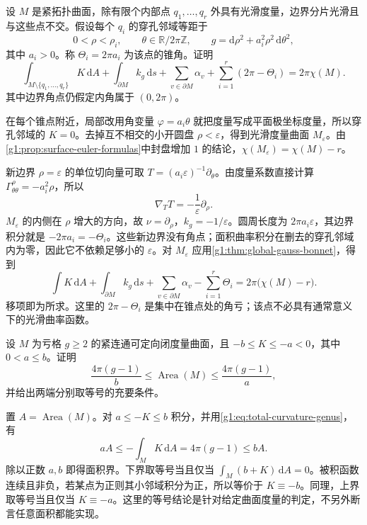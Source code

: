 \begin{exercise}\label{g1:ex:gb-cone-points}
	设 \(M\) 是紧拓扑曲面，除有限个内部点 \(q_1,\ldots,q_r\) 外具有光滑度量，边界分片光滑且与这些点不交。假设每个 \(q_i\) 的穿孔邻域等距于
	\[
		0<\rho<\rho_i,\qquad \theta\in\mathbb R/2\pi\mathbb Z,
		\qquad g=\mathrm{d}\rho^2+a_i^2\rho^2\,\mathrm{d}\theta^2,
	\]
	其中 \(a_i>0\)。称 \(\Theta_i=2\pi a_i\) 为该点的锥角。证明
	\[
		\int_{M\setminus\{q_1,\ldots,q_r\}}K\,\mathrm{d}A
		+\int_{\partial M}k_g\,\mathrm{d}s+\sum_{v\in\partial M}\alpha_v
		+\sum_{i=1}^r(2\pi-\Theta_i)=2\pi\chi(M).
	\]
	其中边界角点仍假定内角属于 \((0,2\pi)\)。
\end{exercise}
\begin{solution}
	在每个锥点附近，局部改用角变量 \(\varphi=a_i\theta\) 就把度量写成平面极坐标度量，所以穿孔邻域的 \(K=0\)。去掉互不相交的小开圆盘 \(\rho<\varepsilon\)，得到光滑度量曲面 \(M_\varepsilon\)。由\cref{g1:prop:surface-euler-formulas}中封盘增加 \(1\) 的结论，\(\chi(M_\varepsilon)=\chi(M)-r\)。

	新边界 \(\rho=\varepsilon\) 的单位切向量可取 \(T=(a_i\varepsilon)^{-1}\partial_\theta\)。由度量系数直接计算 \(\Gamma^\rho_{\theta\theta}=-a_i^2\rho\)，所以
	\[
		\nabla_TT=-\frac1\varepsilon\partial_\rho.
	\]
	\(M_\varepsilon\) 的内侧在 \(\rho\) 增大的方向，故 \(\nu=\partial_\rho\)，\(k_g=-1/\varepsilon\)。圆周长度为 \(2\pi a_i\varepsilon\)，其边界积分就是 \(-2\pi a_i=-\Theta_i\)。这些新边界没有角点；面积曲率积分在删去的穿孔邻域内为零，因此它不依赖足够小的 \(\varepsilon\)。对 \(M_\varepsilon\) 应用\cref{g1:thm:global-gauss-bonnet}，得到
	\[
		\int K\,\mathrm{d}A+\int_{\partial M}k_g\,\mathrm{d}s
		+\sum_{v\in\partial M}\alpha_v-\sum_{i=1}^r\Theta_i
		=2\pi\bigl(\chi(M)-r\bigr).
	\]
	移项即为所求。这里的 \(2\pi-\Theta_i\) 是集中在锥点处的角亏；该点不必具有通常意义下的光滑曲率函数。
\end{solution}

\begin{exercise}\label{g1:ex:negative-curvature-area-bounds}
	设 \(M\) 为亏格 \(g\ge2\) 的紧连通可定向闭度量曲面，且 \(-b\le K\le-a<0\)，其中 \(0<a\le b\)。证明
	\[
		\frac{4\pi(g-1)}b\le\operatorname{Area}(M)\le\frac{4\pi(g-1)}a,
	\]
	并给出两端分别取等号的充要条件。
\end{exercise}
\begin{solution}
	置 \(A=\operatorname{Area}(M)\)。对 \(a\le-K\le b\) 积分，并用\eqref{g1:eq:total-curvature-genus}，有
	\[
		aA\le-\int_MK\,\mathrm{d}A=4\pi(g-1)\le bA.
	\]
	除以正数 \(a,b\) 即得面积界。下界取等号当且仅当 \(\int_M(b+K)\,\mathrm{d}A=0\)。被积函数连续且非负，若某点为正则其小邻域积分为正，所以等价于 \(K\equiv-b\)。同理，上界取等号当且仅当 \(K\equiv-a\)。这里的等号结论是针对给定曲面度量的判定，不另外断言任意面积都能实现。
\end{solution}

